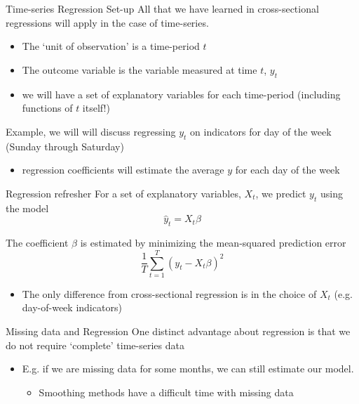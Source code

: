 \documentclass[aspectratio=169,t,11pt,table]{beamer}
\begin{document}
\begin{frame}{Time-series Regression Set-up}
  All that we have learned in cross-sectional regressions will apply in the case of time-series. 
  \begin{itemize}
    \item The `unit of observation' is a time-period $t$
    \item The outcome variable is the variable measured at time $t$, $y_t$
    \item we will have a set of explanatory variables for each time-period (including functions of $t$ itself!)
  \end{itemize}

  \pause
  \bigskip
  Example, we will will discuss regressing $y_t$ on indicators for day of the week (Sunday through Saturday)
  \begin{itemize}
    \item regression coefficients will estimate the average $y$ for each day of the week
  \end{itemize}
\end{frame}

\begin{frame}{Regression refresher}
  For a set of explanatory variables, $X_t$, we predict $y_t$ using the model
  $$
    \hat{y}_t = X_t \beta
  $$

  \bigskip
  The coefficient $\beta$ is estimated by minimizing the mean-squared prediction error
  $$
    \frac{1}{T} \sum_{t=1}^T (y_t - X_t \beta)^2
  $$
  \begin{itemize}
    \item The only difference from cross-sectional regression is in the choice of $X_t$ (e.g. day-of-week indicators)
  \end{itemize}
\end{frame}

\begin{frame}{Missing data and Regression}
  One distinct advantage about regression is that we do not require `complete' time-series data
  \begin{itemize}
    \item E.g. if we are missing data for some months, we can still estimate our model. 
    \begin{itemize}
      \item Smoothing methods have a difficult time with missing data
    \end{itemize}
  \end{itemize}
\end{frame}
\end{document}
